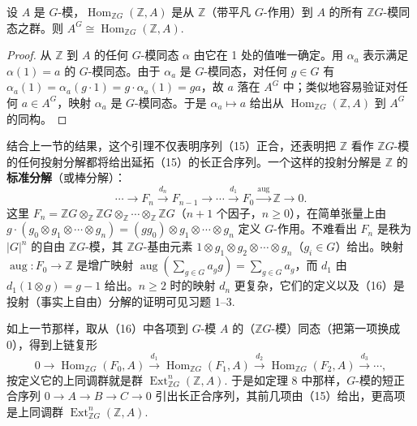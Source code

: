 \begin{lemma}\label{lem:17.19}
设 \(A\) 是 \(G\)-模，\(\operatorname{Hom}_{\mathbb{Z}G}(\mathbb{Z}, A)\) 是从 \(\mathbb{Z}\)（带平凡 \(G\)-作用）到 \(A\) 的所有 \(\mathbb{Z}G\)-模同态之群。则 \(A^G \cong \operatorname{Hom}_{\mathbb{Z}G}(\mathbb{Z}, A)\).
\end{lemma}

\begin{proof}
从 \(\mathbb{Z}\) 到 \(A\) 的任何 \(G\)-模同态 \(\alpha\) 由它在 1 处的值唯一确定。用 \(\alpha_a\) 表示满足 \(\alpha(1) = a\) 的 \(G\)-模同态。由于 \(\alpha_a\) 是 \(G\)-模同态，对任何 \(g \in G\) 有 \(\alpha_a(1) = \alpha_a(g \cdot 1) = g \cdot \alpha_a(1) = ga\)，故 \(a\) 落在 \(A^G\) 中；类似地容易验证对任何 \(a \in A^G\)，映射 \(\alpha_a\) 是 \(G\)-模同态。于是 \(\alpha_a \mapsto a\) 给出从 \(\operatorname{Hom}_{\mathbb{Z}G}(\mathbb{Z}, A)\) 到 \(A^G\) 的同构。
\end{proof}

结合上一节的结果，这个引理不仅表明序列（15）正合，还表明把 \(\mathbb{Z}\) 看作 \(\mathbb{Z}G\)-模的任何投射分解都将给出延拓（15）的长正合序列。一个这样的投射分解是 \(\mathbb{Z}\) 的\textbf{标准分解}（或棒分解）：
\[
\cdots \to F_n \xrightarrow{d_n} F_{n-1} \to \cdots \xrightarrow{d_1} F_0 \xrightarrow{\text{aug}} \mathbb{Z} \to 0. \tag{17.16}
\]
这里 \(F_n = \mathbb{Z}G \otimes_{\mathbb{Z}}\mathbb{Z}G \otimes_{\mathbb{Z}}\cdots \otimes_{\mathbb{Z}}\mathbb{Z}G\)（\(n+1\) 个因子，\(n \geq 0\)），在简单张量上由 \(g \cdot (g_0 \otimes g_1 \otimes \cdots \otimes g_n) = (gg_0) \otimes g_1 \otimes \cdots \otimes g_n\) 定义 \(G\)-作用。不难看出 \(F_n\) 是秩为 \(|G|^n\) 的自由 \(\mathbb{Z}G\)-模，其 \(\mathbb{Z}G\)-基由元素 \(1 \otimes g_1 \otimes g_2 \otimes \cdots \otimes g_n\)（\(g_i \in G\)）给出。映射 \(\operatorname{aug} : F_0 \to \mathbb{Z}\) 是增广映射 \(\operatorname{aug}(\sum_{g \in G}a_gg) = \sum_{g \in G}a_g\)，而 \(d_1\) 由 \(d_1(1 \otimes g) = g-1\) 给出。\(n \geq 2\) 时的映射 \(d_n\) 更复杂，它们的定义以及（16）是投射（事实上自由）分解的证明可见习题 1--3.

如上一节那样，取从（16）中各项到 \(G\)-模 \(A\) 的（\(\mathbb{Z}G\)-模）同态（把第一项换成 0），得到上链复形
\[
0 \to \operatorname{Hom}_{\mathbb{Z}G}(F_0, A) \xrightarrow{d_1} \operatorname{Hom}_{\mathbb{Z}G}(F_1, A) \xrightarrow{d_2} \operatorname{Hom}_{\mathbb{Z}G}(F_2, A) \xrightarrow{d_3} \cdots, \tag{17.17}
\]
按定义它的上同调群就是群 \(\operatorname{Ext}_{\mathbb{Z}G}^n(\mathbb{Z}, A)\). 于是如定理 8 中那样，\(G\)-模的短正合序列 \(0 \to A \to B \to C \to 0\) 引出长正合序列，其前几项由（15）给出，更高项是上同调群 \(\operatorname{Ext}_{\mathbb{Z}G}^n(\mathbb{Z}, A)\).

